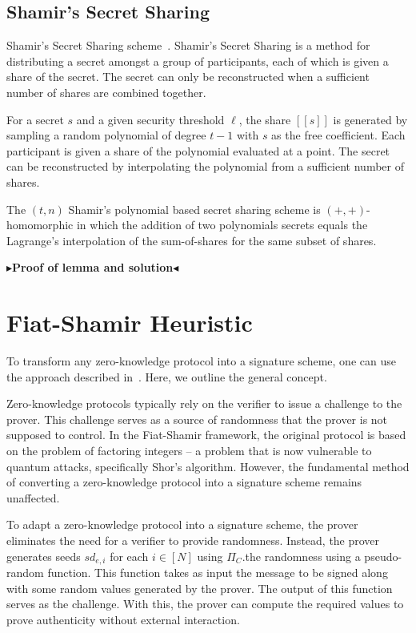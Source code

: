 \documentclass[twoside,11pt]{report}
\theoremstyle{definition}
\theoremstyle{plain}
\newcommand{\todo}[1]{{\color[rgb]{.5,0,0}\textbf{$\blacktriangleright$#1$\blacktriangleleft$}}}
\begin{document}
\subsection{Shamir's Secret Sharing}\label{sec:shamir}

Shamir's Secret Sharing scheme~\cite{shamir1979share}. Shamir's Secret Sharing is a method for distributing a secret amongst a group of participants, each of which is given a share of the secret. The secret can only be reconstructed when a sufficient number of shares are combined together.

For a secret $s$ and a given security threshold $\ell$, the share $[[s]]$ is generated by sampling a random polynomial of degree $t-1$ with $s$ as the free coefficient. Each participant is given a share of the polynomial evaluated at a point. The secret can be reconstructed by interpolating the polynomial from a sufficient number of shares.

The $(t,n)$ Shamir's polynomial based secret sharing scheme is $(+,+)$-homomorphic in which the addition of two polynomials secrets equals the Lagrange's interpolation of the sum-of-shares for the same subset of shares.

\todo{Proof of lemma and solution}

\section{Fiat-Shamir Heuristic}\label{sec:fiatshamir}
To transform any zero-knowledge protocol into a signature scheme, one can use the approach described in~\cite{fiat1986prove}. Here, we outline the general concept.

Zero-knowledge protocols typically rely on the verifier to issue a challenge to the prover. This challenge serves as a source of randomness that the prover is not supposed to control. In the Fiat-Shamir framework, the original protocol is based on the problem of factoring integers -- a problem that is now vulnerable to quantum attacks, specifically Shor's algorithm. However, the fundamental method of converting a zero-knowledge protocol into a signature scheme remains unaffected.

To adapt a zero-knowledge protocol into a signature scheme, the prover eliminates the need for a verifier to provide randomness. Instead, the prover generates seeds $sd_{e,i}$ for each $i \in [N]$ using $\Pi_C$.the randomness using a pseudo-random function. This function takes as input the message to be signed along with some random values generated by the prover. The output of this function serves as the challenge. With this, the prover can compute the required values to prove authenticity without external interaction.
\end{document}
